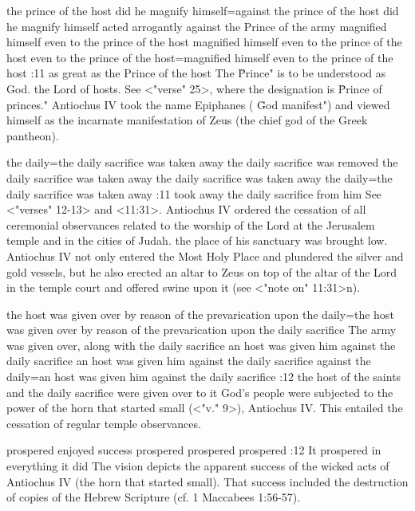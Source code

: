     {the prince of the host did he magnify himself}={against the prince of the host did he magnify himself} %
    {acted arrogantly against the Prince of the army} %
    {magnified himself even to the prince of the host} %
    {magnified himself even to the prince of the host} %
    {even to the prince of the host}={magnified himself even to the prince of the host} %
:11 {as great as the Prince of the host} The \"Prince" is to be understood as God. the Lord of hosts. See <"verse" 25>, where the designation is \"Prince of
princes." Antiochus IV took the name Epiphanes ( \"God manifest") and viewed himself as the incarnate manifestation of Zeus (the chief god of the Greek pantheon).

    {the daily}={the daily sacrifice was taken away} %
    {the daily sacrifice was removed} %
    {the daily sacrifice was taken away} %
    {the daily sacrifice was taken away} %
    {the daily}={the daily sacrifice was taken away} %
:11 {took away the daily sacrifice from him} See <"verses" 12-13> and <11:31>. 
Antiochus IV ordered the cessation of all ceremonial observances related to the worship of the Lord at the Jerusalem temple and in 
the cities of Judah. the place of his sanctuary was brought low. Antiochus IV not only entered the Most Holy Place and plundered 
the silver and gold vessels, but he also erected an altar to Zeus on top of the altar of the Lord in the temple court and offered swine 
upon it (see <"note on" 11:31>n).

    {the host was given over by reason of the prevarication upon the daily}={the host was given over by reason of the prevarication upon the daily sacrifice} %
    {The army was given over, along with the daily sacrifice} %
    {an host was given him against the daily sacrifice} %
    {an host was given him against the daily sacrifice} %
    {against the daily}={an host was given him against the daily sacrifice} %
:12 {the host of the saints and the daily sacrifice were given over to it} God's people were subjected to the power of the horn 
that started small (<"v." 9>), Antiochus IV. This entailed the cessation of regular temple observances.

    {prospered} %
    {enjoyed success} %
    {prospered} %
    {prospered} %
    {prospered} %
:12 {It prospered in everything it did}
The vision depicts the apparent success of the wicked acts of Antiochus IV (the horn that started
small). That success included the destruction of copies of the Hebrew Scripture (cf. 1 Maccabees 
1:56-57).

